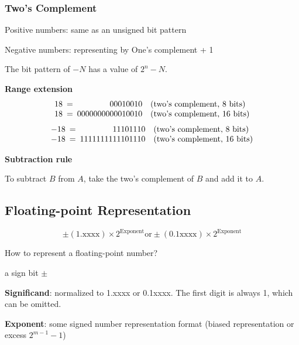 \documentclass[11pt,a4paper]{article}
\begin{document}
\subsubsection{Two's Complement}
Positive numbers: same as an unsigned bit pattern \par
Negative numbers: representing by One's complement + 1 \par
The bit pattern of $-N$ has a value of $2^n-N$. \par 

\textbf{Range extension}
\[
\begin{array}{r@{}c@{}l}
18 \phantom{0} & = & \phantom{000000000}00010010 \quad (\text{two's complement, 8 bits}) \\
18 \phantom{0} & = & \phantom{0}0000000000010010 \quad (\text{two's complement, 16 bits})
\end{array}
\]
\[
\begin{array}{r@{}c@{}l}
-18 \phantom{0} & = & \phantom{000000000}11101110 \quad (\text{two's complement, 8 bits}) \\
-18 \phantom{0} & = & \phantom{0}1111111111101110 \quad (\text{two's complement, 16 bits})
\end{array}
\]

\textbf{Subtraction rule} \par
To subtract $B$ from $A$, take the two's complement of $B$ and add it to $A$.

\subsection{Floating-point Representation}
\[
\pm (1.\text{xxxx}) \times 2^{\text{Exponent}} \text{or} \pm (0.1\text{xxxx}) \times 2^{\text{Exponent}} 
\]

How to represent a floating-point number? \par
a sign bit $\pm$ \par
\textbf{Significand}: normalized to 1.xxxx or 0.1xxxx. The first digit is always 1, which can be omitted. \par
\textbf{Exponent}: some signed number representation format (biased representation or excess $2^{m-1}-1$) \par
{}
\end{document}

